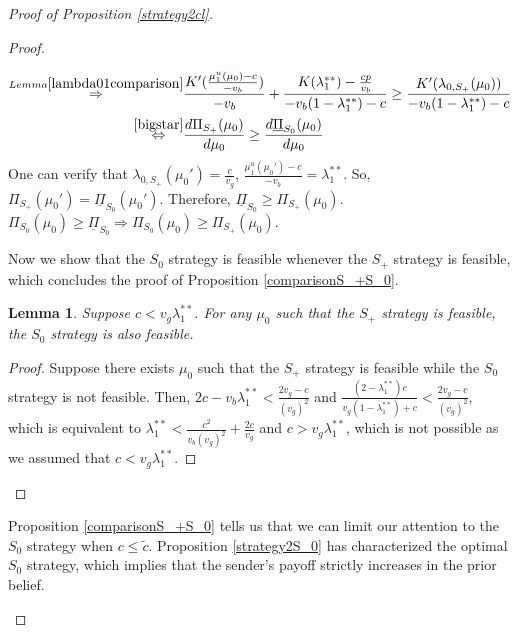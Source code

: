 \documentclass[11pt]{extarticle}
\newtheorem{lemma}{Lemma}
\newcommand{\lra}{\Leftrightarrow}
\newcommand{\ra}{\Rightarrow}
\begin{document}
\begin{proof}[Proof of Proposition \ref{strategy2cl}]
\begin{enumerate}[(1)]
\begin{proof}
\begin{enumerate}[i)]
\begin{align*}
				\overset{Lemma \ref{lambda01comparison}}{\ra}&\frac{K'(\frac{\mu_1^u(\mu_0)-c}{-v_b})}{-v_b} + \frac{K(\lambda_1^{**})-\frac{cp}{v_b}}{-v_b(1-\lambda_1^{**})-c} \geq \frac{K'(\lambda_{0,S_+}(\mu_0))}{-v_b(1-\lambda_1^{**})-c}\\
				\overset{\eqref{bigstar}}{\lra}&\frac{d \Pi_{S_+}(\mu_0)}{d \mu_0} \geq \frac{d \underline{\Pi}_{S_0}(\mu_0)}{d \mu_0}
				\end{align*}
				\endgroup
				\normalsize One can verify that $\lambda_{0,S_+}(\mu_0') = \frac{c}{v_g}$, $\frac{\mu_1^u(\mu_0')-c}{-v_b} = \lambda_1^{**}$. So, $\Pi_{S_+}(\mu_0') = \underline{\Pi}_{S_0}(\mu_0')$. Therefore, $\underline{\Pi}_{S_0} \geq \Pi_{S_+}(\mu_0)$. $\Pi_{S_0}(\mu_0)\geq \underline{\Pi}_{S_0} \ra	\Pi_{S_0}(\mu_0) \geq \Pi_{S_+}(\mu_0)$.
			\end{enumerate}
			
			Now we show that the $S_0$ strategy is feasible whenever the $S_+$ strategy is feasible, which concludes the proof of Proposition \ref{comparisonS_+S_0}.
			\begin{lemma}\label{S_+S_0}
				Suppose $c < v_g\lambda_1^{**}$. For any $\mu_0$ such that the $S_+$ strategy is feasible, the $S_0$ strategy is also feasible.
			\end{lemma}
			\begin{proof}
				Suppose there exists $\mu_0$ such that the $S_+$ strategy is feasible while the $S_0$ strategy is not feasible. Then, $2c-v_b\lambda_1^{**} < \frac{2v_g-c}{(v_g)^2}$ and $\frac{(2-\lambda_1^{**})c}{v_g(1-\lambda_1^{**})+c} < \frac{2v_g-c}{(v_g)^2}$, which is equivalent to $\lambda_1^{**} < \frac{c^2}{v_b(v_g)^2}+\frac{2c}{v_g}$ and $c > v_g\lambda_1^{**}$, which is not possible as we assumed that $c < v_g\lambda_1^{**}$.
			\end{proof} 
		\end{proof}	
		\vspace{-15pt}
		Proposition \ref{comparisonS_+S_0} tells us that we can limit our attention to the $S_0$ strategy when $c \leq \tilde{c}$. Proposition \ref{strategy2S_0} has characterized the optimal $S_0$ strategy, which implies that the sender's payoff strictly increases in the prior belief.
	\end{enumerate} 
\end{proof}
\end{document}
